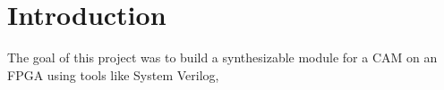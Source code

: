 \section{Introduction}
The goal of this project was to build a synthesizable module for a CAM on an FPGA using tools like System Verilog, 
